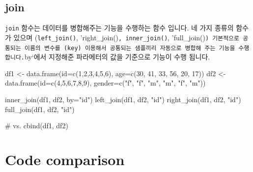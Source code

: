 \documentclass[
  a4paper,
]{book}
\newenvironment{Shaded}{\begin{snugshade}}{\end{snugshade}}
\newcommand{\AttributeTok}[1]{\textcolor[rgb]{0.40,0.45,0.13}{#1}}
\newcommand{\CommentTok}[1]{\textcolor[rgb]{0.37,0.37,0.37}{#1}}
\newcommand{\DecValTok}[1]{\textcolor[rgb]{0.68,0.00,0.00}{#1}}
\newcommand{\FunctionTok}[1]{\textcolor[rgb]{0.28,0.35,0.67}{#1}}
\newcommand{\NormalTok}[1]{\textcolor[rgb]{0.00,0.23,0.31}{#1}}
\newcommand{\OtherTok}[1]{\textcolor[rgb]{0.00,0.23,0.31}{#1}}
\newcommand{\StringTok}[1]{\textcolor[rgb]{0.13,0.47,0.30}{#1}}
\begin{document}
\hypertarget{join}{%
\subsection{join}\label{join}}

\texttt{join} 함수는 데이터를 병합해주는 기능을 수행하는 함수 입니다. 네
가지 종류의 함수가 있으며 (\texttt{left\_join()},
'right\_join()\texttt{,\ \textquotesingle{}inner\_join()},
'full\_join()\texttt{)\ 기본적으로\ 공통되는\ 이름의\ 변수를\ (key)\ 이용해서\ 공통되는\ 샘플끼리\ 자동으로\ 병합해\ 주는\ 기능을\ 수행합니다.}by`에서
지정해준 파라메터의 값을 기준으로 기능이 수행 됩니다.

\begin{Shaded}
\begin{Highlighting}[]
\NormalTok{df1 }\OtherTok{\textless{}{-}} \FunctionTok{data.frame}\NormalTok{(}\AttributeTok{id=}\FunctionTok{c}\NormalTok{(}\DecValTok{1}\NormalTok{,}\DecValTok{2}\NormalTok{,}\DecValTok{3}\NormalTok{,}\DecValTok{4}\NormalTok{,}\DecValTok{5}\NormalTok{,}\DecValTok{6}\NormalTok{), }\AttributeTok{age=}\FunctionTok{c}\NormalTok{(}\DecValTok{30}\NormalTok{, }\DecValTok{41}\NormalTok{, }\DecValTok{33}\NormalTok{, }\DecValTok{56}\NormalTok{, }\DecValTok{20}\NormalTok{, }\DecValTok{17}\NormalTok{))}
\NormalTok{df2 }\OtherTok{\textless{}{-}} \FunctionTok{data.frame}\NormalTok{(}\AttributeTok{id=}\FunctionTok{c}\NormalTok{(}\DecValTok{4}\NormalTok{,}\DecValTok{5}\NormalTok{,}\DecValTok{6}\NormalTok{,}\DecValTok{7}\NormalTok{,}\DecValTok{8}\NormalTok{,}\DecValTok{9}\NormalTok{), }\AttributeTok{gender=}\FunctionTok{c}\NormalTok{(}\StringTok{"f"}\NormalTok{, }\StringTok{"f"}\NormalTok{, }\StringTok{"m"}\NormalTok{, }\StringTok{"m"}\NormalTok{, }\StringTok{"f"}\NormalTok{, }\StringTok{"m"}\NormalTok{))}

\FunctionTok{inner\_join}\NormalTok{(df1, df2, }\AttributeTok{by=}\StringTok{"id"}\NormalTok{)}
\FunctionTok{left\_join}\NormalTok{(df1, df2, }\StringTok{"id"}\NormalTok{)}
\FunctionTok{right\_join}\NormalTok{(df1, df2, }\StringTok{"id"}\NormalTok{)}
\FunctionTok{full\_join}\NormalTok{(df1, df2, }\StringTok{"id"}\NormalTok{)}

\CommentTok{\# vs.}
\FunctionTok{cbind}\NormalTok{(df1, df2)}
\end{Highlighting}
\end{Shaded}

\hypertarget{code-comparison}{%
\section{Code comparison}\label{code-comparison}}
\end{document}
